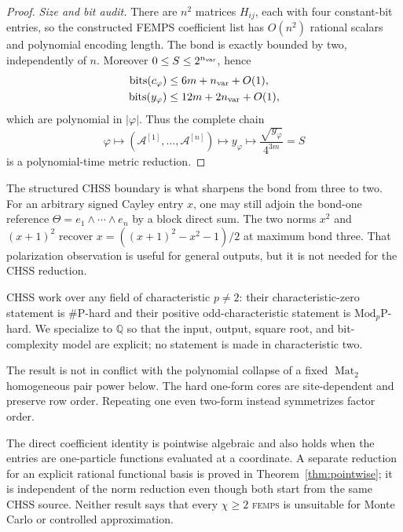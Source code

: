 \documentclass[aps,pra,reprint,superscriptaddress,nofootinbib,longbibliography,showkeys]{revtex4-2}
\theoremstyle{definition}
\newcommand{\Mat}{\operatorname{Mat}}
\newcommand{\FEMPS}{\textnormal{\textsc{femps}}}
\begin{document}
\begin{proof}
\medskip\noindent\textit{Size and bit audit.}\quad
There are $n^2$ matrices $H_{ij}$, each with four constant-bit entries, so the
constructed FEMPS coefficient list has $O(n^2)$ rational scalars and polynomial
encoding length.  The bond is exactly bounded by two, independently of $n$.
Moreover $0\le S\le2^{n_{\rm var}}$, hence
\begin{align}
\operatorname{bits}(c_\varphi)
&\le 6m+n_{\rm var}+O(1),\\
\operatorname{bits}(y_\varphi)
&\le 12m+2n_{\rm var}+O(1),
\end{align}
which are polynomial in $|\varphi|$.  Thus the complete chain
\begin{equation}
\varphi\longmapsto (\mathcal A^{[1]},\ldots,\mathcal A^{[n]})
\longmapsto y_\varphi
\longmapsto \frac{\sqrt{y_\varphi}}{4^{3m}}=S
\end{equation}
is a polynomial-time metric reduction.
\end{proof}

The structured CHSS boundary is what sharpens the bond from three to two.  For
an arbitrary signed Cayley entry $x$, one may still adjoin the bond-one
reference $\Theta=e_1\wedge\cdots\wedge e_n$ by a block direct sum.  The two
norms $x^2$ and $(x+1)^2$ recover
$x=((x+1)^2-x^2-1)/2$ at maximum bond three.  That polarization observation is
useful for general outputs, but it is not needed for the CHSS reduction.

CHSS work over any field of characteristic $p\ne2$: their characteristic-zero
statement is \#P-hard and their positive odd-characteristic statement is
$\mathrm{Mod}_p\mathrm P$-hard.  We specialize to $\mathbb Q$ so that the
input, output, square root, and bit-complexity model are explicit; no statement
is made in characteristic two.

The result is not in conflict with the polynomial collapse of a fixed
$\Mat_2$ homogeneous pair power below.  The hard one-form cores are
site-dependent and preserve row order.  Repeating one even two-form instead
symmetrizes factor order.

The direct coefficient identity is pointwise algebraic and also holds when
the entries are one-particle functions evaluated at a coordinate.  A separate
reduction for an explicit rational functional basis is proved in
Theorem~\ref{thm:pointwise}; it is independent of the norm reduction even
though both start from the same CHSS source.  Neither result says that every
$\chi\ge2$ \FEMPS{} is unsuitable for Monte Carlo or controlled approximation.
\end{document}

